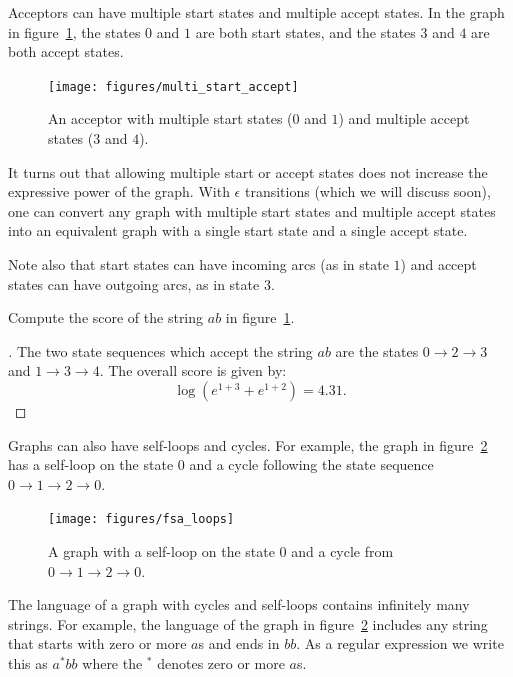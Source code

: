 Acceptors can have multiple start states and multiple accept states. In the
graph in figure~\ref{fig:multi_start_accept}, the states $0$ and $1$ are both
start states, and the states $3$ and $4$ are both accept states.

\begin{figure}
    \centering
    \texttt{[image: figures/multi\_start\_accept]}
    \caption{An acceptor with multiple start states ($0$ and $1$) and multiple
    accept states ($3$ and $4$).}
    \label{fig:multi_start_accept}
\end{figure}

It turns out that allowing multiple start or accept states does not increase
the expressive power of the graph. With $\epsilon$ transitions (which we will
discuss soon), one can convert any graph with multiple start states and
multiple accept states into an equivalent graph with a single start state and a
single accept state.

Note also that start states can have incoming arcs (as in state $1$) and accept
states can have outgoing arcs, as in state $3$.

\begin{example}
Compute the score of the string $ab$ in figure~\ref{fig:multi_start_accept}.
\end{example}

\begin{proof}[\unskip\nopunct]
The two state sequences which accept the string $ab$ are the states $0
\rightarrow 2 \rightarrow 3$ and $1 \rightarrow 3 \rightarrow 4$. The overall
score is given by:
$$
\log (e^{1 + 3} + e^{1 + 2}) = 4.31.
$$
\end{proof}

Graphs can also have self-loops and cycles. For example, the graph in
figure~\ref{fig:fsa_loops} has a self-loop on the state $0$ and a cycle
following the state sequence $0 \rightarrow 1 \rightarrow 2 \rightarrow 0$.

\begin{figure}
    \centering
    \texttt{[image: figures/fsa\_loops]}
    \caption{A graph with a self-loop on the state $0$ and a cycle from $0
    \rightarrow 1 \rightarrow 2 \rightarrow 0$.}
    \label{fig:fsa_loops}
\end{figure}

The language of a graph with cycles and self-loops contains infinitely many
strings.  For example, the language of the graph in figure~\ref{fig:fsa_loops}
includes any string that starts with zero or more $a$s and ends in $bb$. As a
regular expression we write this as $a^*bb$ where the $^*$ denotes zero or more
$a$s.

